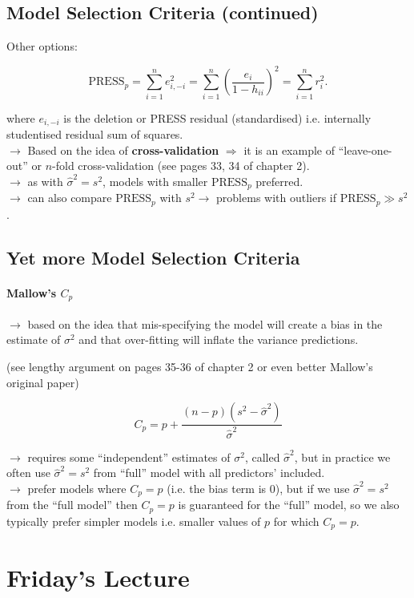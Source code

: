 \documentclass[a4paper, 11pt, twoside]{article}
\begin{document}
\subsection{Model Selection Criteria (continued)}

Other options:

\[\text{PRESS}_p = \sum^n_{i=1} e_{i, -i}^2 = \sum^n_{i=1}\left(\frac{e_i}{1-h_{ii}}\right)^2=\sum^n_{i=1}r_i^2.\]

where $e_{i,-i}$ is the deletion or PRESS residual (standardised) i.e. internally studentised residual sum of squares.\\

$\longrightarrow$ Based on the idea of \textbf{cross-validation} $\Longrightarrow$ it is an example of ``leave-one-out'' or $n$-fold cross-validation (see pages 33, 34 of chapter 2).\\

$\longrightarrow$ as with $\hat{\sigma}^2=s^2$, models with smaller $\text{PRESS}_p$ preferred.\\

$\longrightarrow$ can also compare $\text{PRESS}_p$ with $s^2 \longrightarrow$ problems with outliers if $\text{PRESS}_p\gg s^2$.\\

\subsection{Yet more Model Selection Criteria}

\paragraph{Mallow's $C_p$}

$\longrightarrow$ based on the idea that mis-specifying the model will create a bias in the estimate of $\sigma^2$ and that over-fitting will inflate the variance predictions.

(see lengthy argument on pages 35-36 of chapter 2 or even better Mallow's original paper)

\[C_p = p + \frac{(n-p)(s^2-\hat{\sigma}^2)}{\hat{\sigma}^2}\]

$\longrightarrow$ requires some ``independent'' estimates of $\sigma^2$, called $\hat{\sigma}^2$, but in practice we often use $\hat{\sigma}^2=s^2$ from ``full'' model with all predictors' included.\\

$\longrightarrow$ prefer models where $C_p=p$ (i.e. the bias term is $0$), but if we use $\hat{\sigma}^2=s^2$ from the ``full model'' then $C_p=p$ is guaranteed for the ``full'' model, so we also typically prefer simpler models i.e. smaller values of $p$ for which $C_p=p$.

\section{Friday's Lecture}
\end{document}
